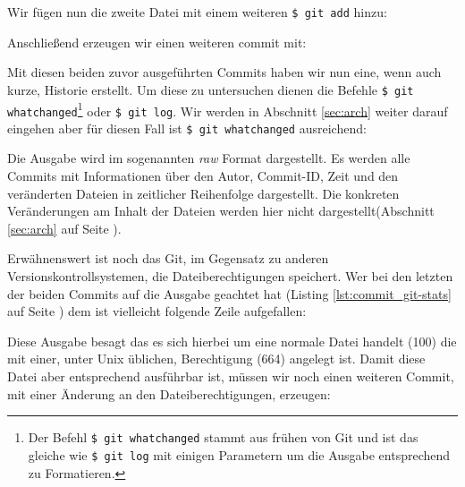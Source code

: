 Wir fügen nun die zweite Datei mit einem weiteren \texttt{\$ git add} hinzu:



Anschließend erzeugen wir einen weiteren \gls{commit} mit:



Mit diesen beiden zuvor ausgeführten Commits haben wir nun eine, wenn auch
kurze, Historie erstellt. Um diese zu untersuchen dienen die Befehle \texttt{\$
git whatchanged}\footnote{Der Befehl \texttt{\$ git whatchanged} stammt aus
frühen von Git und ist das gleiche wie \texttt{\$ git log} mit einigen
Parametern um die Ausgabe entsprechend zu Formatieren.} oder \texttt{\$ git
log}. Wir werden in Abschnitt \ref{sec:arch} weiter darauf eingehen aber für
diesen Fall ist \texttt{\$ git whatchanged} ausreichend:



Die Ausgabe wird im sogenannten \textit{raw} Format dargestellt. Es werden alle
Commits mit Informationen über den Autor, Commit-ID, Zeit und den veränderten
Dateien in zeitlicher Reihenfolge dargestellt. Die konkreten Veränderungen am
Inhalt der Dateien werden hier nicht dargestellt(Abschnitt \ref{sec:arch} auf
Seite \pageref{sec:arch}).

Erwähnenswert ist noch das Git, im Gegensatz zu anderen
Versionskontrollsystemen, die Dateiberechtigungen speichert. Wer bei den
letzten der beiden Commits auf die Ausgabe geachtet hat (Listing
\ref{lst:commit_git-stats} auf Seite \pageref{lst:commit_git-stats}) dem ist
vielleicht folgende Zeile aufgefallen:



Diese Ausgabe besagt das es sich hierbei um eine normale Datei handelt (100)
die mit einer, unter Unix üblichen, Berechtigung (664) angelegt ist. Damit
diese Datei aber entsprechend ausführbar ist, müssen wir noch einen weiteren
Commit, mit einer Änderung an den Dateiberechtigungen, erzeugen:




